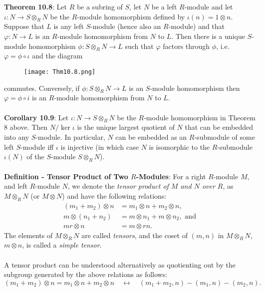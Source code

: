\documentclass{article}
\begin{document}
\textbf{Theorem 10.8}: Let $R$ be a subring of $S$, let $N$ be a left $R$-module and let $\iota: N \rightarrow S \otimes_R N$ be the $R$-module homomorphism defined by $\iota(n) = 1 \otimes n$. Suppose that $L$ is any left $S$-module (hence also an $R$-module) and that $\varphi: N \rightarrow L$ is an $R$-module homomorphism from $N$ to $L$. Then there is a unique $S$-module homomorphism $\phi: S \otimes_R N \rightarrow L$ such that $\varphi$ factors through $\phi$, i.e. $\varphi = \phi \circ \iota$ and the diagram \vspace{-3mm} \begin{figure}[H]
\begin{center}
\texttt{[image: Thm10.8.png]}
\end{center}
\end{figure} \vspace{-5mm} \noindent commutes. Conversely, if $\phi: S \otimes_R N \rightarrow L$ is an $S$-module homomorphism then $\varphi = \phi \circ i$ is an $R$-module homomorphism from $N$ to $L$. \\ \\
\textbf{Corollary 10.9}: Let $\iota: N \rightarrow S \otimes_R N$ be the $R$-module homomorphism in Theorem 8 above. Then $N/\ker{\iota}$ is the unique largest quotient of $N$ that can be embedded into any $S$-module. In particular, $N$ can be embedded as an $R$-submodule of some left $S$-module iff $\iota$ is injective (in which case $N$ is isomorphic to the $R$-submodule $\iota(N)$ of the $S$-module $S \otimes_R N$). \\ \\
\textbf{Definition - Tensor Product of Two $R$-Modules}: For a right $R$-module $M$, and left $R$-module $N$, we denote the \textit{tensor product of $M$ and $N$ over $R$}, as $M \otimes_R N$ (or $M \otimes N$) and have the following relations: \begin{align*}
    (m_1 + m_2) \otimes n &= m_1 \otimes n + m_2 \otimes n, \\
    m \otimes (n_1 + n_2) &= m \otimes n_1 + m \otimes n_2, \text{ and} \\
    mr \otimes n &= m \otimes rn.
\end{align*} The elements of $M \otimes_R N$ are called \textit{tensors}, and the coset of $(m ,n)$ in $M \otimes_R N$, $m \otimes n$, is called a \textit{simple tensor}. \\ \\
A tensor product can be understood alternatively as quotienting out by the subgroup generated by the above relations as follows: $$(m_1 + m_2) \otimes n = m_1 \otimes n + m_2 \otimes n \quad \leftrightarrow \quad (m_1 + m_2, n) - (m_1, n) - (m_2, n).$$ \\
\end{document}
